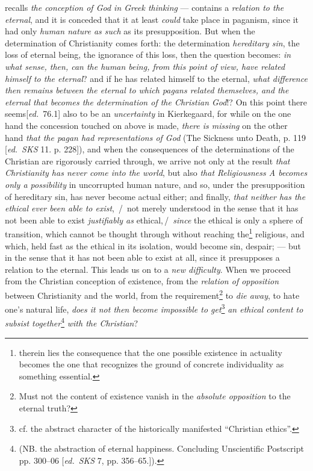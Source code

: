\documentclass[12pt,a4paper,openany]{book}
\newcommand{\kpage}[1]{\marginnote{\footnotesize\textit{[#1]}}}
\newcommand{\ed}[1]{{\small[\textit{ed.}\ #1]}}
\newcommand{\ins}[1]{\,/\,#1\,/\,}
\begin{document}
recalls \emph{the conception of God in Greek thinking} --- contains a \emph{relation
to the eternal}, and it is conceded that it at least \emph{could} take
place in paganism, since it had only \emph{human nature as such} as
its presupposition. But when the determination of Christianity comes
forth: the determination \emph{hereditary sin}, the loss of eternal being, the ignorance
of this loss, then the question becomes: \emph{in what sense, then, can
the human being, from this point of view, have related himself to the eternal}? and if he has
related himself to the eternal, \emph{what difference then remains between the eternal to which
pagans related themselves, and the eternal that becomes the determination of the Christian God}!?
On this point there seems\ed{76.1} also to be an \emph{uncertainty} in
Kierkegaard, for while on the one hand the concession touched on above
is made, \emph{there is missing} on the other hand \emph{that the pagan
had representations of God} (The Sickness unto Death, p. 119 \ed{\emph{SKS} 11. p.
228}), and when the consequences of the determinations of the Christian are
\kpage{174}rigorously carried through, we arrive not only at the result \emph{that Christianity
has never come into the world}, but also \emph{that Religiousness A becomes only
a possibility} in uncorrupted human nature, and so, under the presupposition of
hereditary sin, has never become actual either;
and finally, \emph{that neither has the ethical ever been able to exist}, \ins{
not merely understood in the sense that it has not been able to exist \emph{justifiably
as} ethical,} \emph{since} the ethical is only a sphere of transition, which cannot
be thought through without reaching the\footnote[131]{therein lies the consequence that the one possible existence in actuality becomes the one that recognizes the ground of concrete individuality as something essential.} religious, and which, held fast
as the ethical in its isolation, would become sin, despair;
--- but in the sense that it has not been able to exist at all,
since it presupposes a relation to the eternal. This leads us on to
a \emph{new difficulty}. When we proceed from the Christian conception of
existence, from the \emph{relation of opposition} between Christianity and the world,
from the requirement\footnote[132]{Must not the content of existence vanish in the \emph{absolute opposition} to the eternal truth?} to \emph{die away}, to hate one's natural life, \emph{does it not
then become impossible to get}\footnote[133]{cf. the abstract character of the historically manifested ``Christian ethics''.} \emph{an ethical content to subsist together}\footnote[134]{(NB. the abstraction of eternal happiness. Concluding Unscientific Postscript pp. 300--06 \ed{\emph{SKS} 7, pp. 356--65.}).} \emph{with the Christian}?
\end{document}
